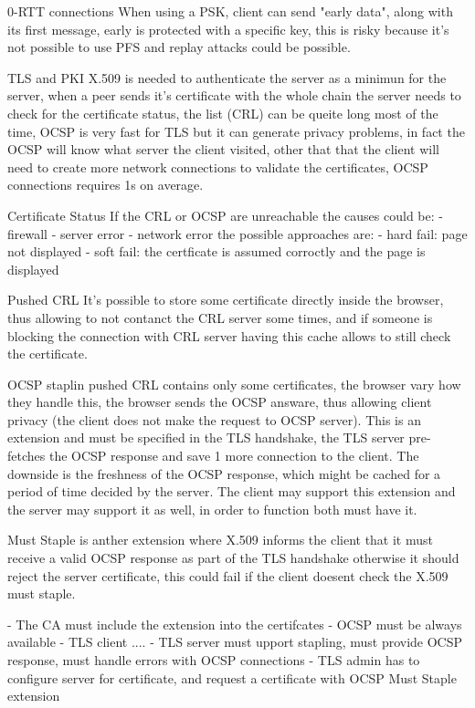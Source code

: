 \documentclass[12pt]{article}
\begin{document}
0-RTT connections
When using a PSK, client can send "early data", along with its first message, early is protected with a specific key, this is risky because it's not possible to use PFS and replay attacks could be possible. 


TLS and PKI 
X.509 is needed to authenticate the server as a minimun for the server, when a peer sends it's certificate with the whole chain the server needs to check for the certificate status, the list (CRL) can be queite long most of the time, OCSP is very fast for TLS but it can generate privacy problems, in fact the OCSP will know what server the client visited, other that that the client will need to create more network connections to validate the certificates, OCSP connections requires 1s on average.

Certificate Status
If the CRL or OCSP are unreachable the causes could be:
- firewall
- server error
- network error
the possible approaches are:
- hard fail: page not displayed
- soft fail: the certficate is assumed corroctly and the page is displayed 

Pushed CRL 
It's possible to store some certificate directly inside the browser, thus allowing to not contanct the CRL server some times, and if someone is blocking the connection with CRL server having this cache allows to still check the certificate.

OCSP staplin
pushed CRL contains only some certificates, the browser vary how they handle this, the browser sends the OCSP answare, thus allowing client privacy (the client does not make the request to OCSP server). This is an extension and must be specified in the TLS handshake, the TLS server pre-fetches the OCSP response and save 1 more connection to the client. The downside is the freshness of the OCSP response, which might be cached for a period of time decided by the server. The client may support this extension and the server may support it as well, in order to function both must have it.

Must Staple
is anther extension where X.509 informs the client that it must receive a valid OCSP response as part of the TLS handshake otherwise it should reject the server certificate, this could fail if the client doesent check the X.509 must staple.

- The CA must include the extension into the certifcates
- OCSP must be always available
- TLS client ....
- TLS server must upport stapling, must provide OCSP response, must handle errors with OCSP connections
- TLS admin has to configure server for certificate, and request a certificate with OCSP Must Staple extension
\end{document}
